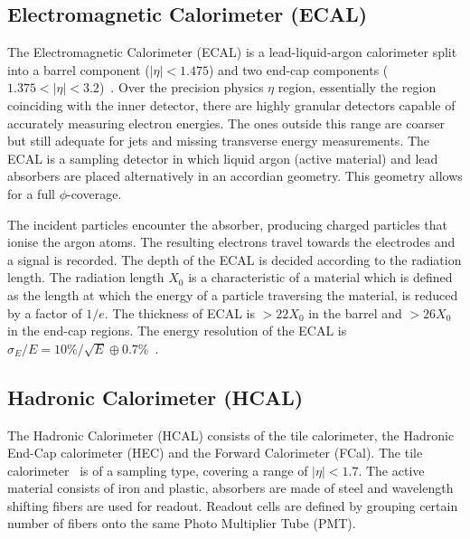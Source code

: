 \subsection*{Electromagnetic Calorimeter (ECAL)}
The Electromagnetic Calorimeter (ECAL) is a lead-liquid-argon calorimeter split into a barrel component ($|\eta|<1.475$) and two end-cap components 
($1.375 < |\eta| < 3.2$)~\cite{TheATLASCollaboration_2008}. Over the precision physics $\eta$ region, essentially the region coinciding with the inner detector, there are highly granular
detectors capable of accurately measuring electron energies. The ones outside this range are coarser but still adequate for jets and missing transverse energy measurements.
The ECAL is a sampling detector in which liquid argon (active material) and lead absorbers are placed alternatively in an accordian geometry. This geometry allows for a full 
$\phi$-coverage. 

The incident particles encounter the absorber, producing charged particles that ionise the argon atoms. The resulting electrons travel towards the electrodes and a
signal is recorded. The depth of the ECAL is decided according to the radiation length. The radiation length $X_0$ is a characteristic of a material which is defined as 
the length at which the energy of a particle traversing the material, is reduced by a factor of $1/e$. The thickness of ECAL is $> 22 X_0$ in the barrel and $> 26 X_0$ in the end-cap
regions. The energy resolution of the ECAL is $\sigma_E/E = 10\%/\sqrt{E} \oplus 0.7\%$~\cite{CERN-LHCC-2017-018}.

\subsection*{Hadronic Calorimeter (HCAL)}
The Hadronic Calorimeter (HCAL) consists of the tile calorimeter, the Hadronic End-Cap calorimeter (HEC) and the Forward Calorimeter (FCal). The tile calorimeter~\cite{Francavilla_2012} is of a sampling
type, covering a range of $|\eta|<1.7$. The active material consists of iron and plastic, absorbers are made of steel and wavelength shifting fibers are used for readout.
Readout cells are defined by grouping certain number of fibers onto the same Photo Multiplier Tube (PMT). 

